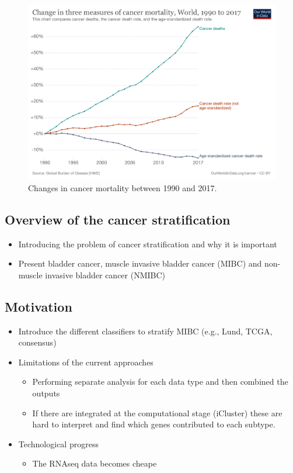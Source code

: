 \begin{figure}[!htb]
    \centering\includegraphics[width=1.0\textwidth,height=0.3\textheight,keepaspectratio]{Images/cancer-deaths-rate-and-age-standardized-rate-index.png}
      \caption{Changes in cancer mortality between 1990 and 2017. \cite{World_in_Data_undated-gc}}
      \label{fig:cancer_death}
\end{figure}


\newpage

\subsection{Overview of the cancer stratification}

\begin{itemize}
    \item Introducing the problem of cancer stratification and why it is important
    \item Present bladder cancer, muscle invasive bladder cancer (MIBC) and non-muscle invasive bladder cancer (NMIBC)
\end{itemize}

\subsection{Motivation}

\begin{itemize}
    \item Introduce the different classifiers to stratify MIBC (e.g., Lund, TCGA, consensus)
    \item Limitations of the current approaches
    \begin{itemize}
        \item Performing separate analysis for each data type and then combined the outputs 
        \item If there are integrated at the computational stage (iCluster) these are hard to interpret and find which genes contributed to each subtype.
    \end{itemize}
    \item Technological progress    
    \begin{itemize}
        \item The RNAseq data becomes cheape
    \end{itemize}
\end{itemize}


